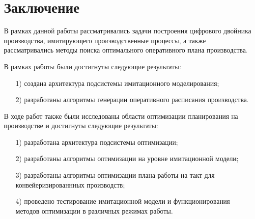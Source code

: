 
\section*{Заключение}
В рамках данной работы рассматривались задачи построения цифрового двойника производства, имитирующего
производственные процессы, а также рассматривались методы поиска оптимального оперативного плана производства.

В рамках работы были достигнуты следующие результаты:

\begin{itemize}
    \item [1)] создана архитектура подсистемы имитационного моделирования;
    \item [2)] разработаны алгоритмы генерации оперативного расписания производства.
\end{itemize}

В ходе работ также были исследованы области оптимизации планирования на производстве и достигнуты следующие результаты:

\begin{itemize}
    \item [1)] разработана архитектура подсистемы оптимизации;
    \item [2)] разработаны алгоритмы оптимизации на уровне имитационной модели;
    \item [3)] разработаны алгоритмы оптимизации плана работы на такт для конвейеризированнных производств;
    \item [4)] проведено тестирование имитационной модели и функционирования методов оптимизации в различных режимах работы.
\end{itemize}